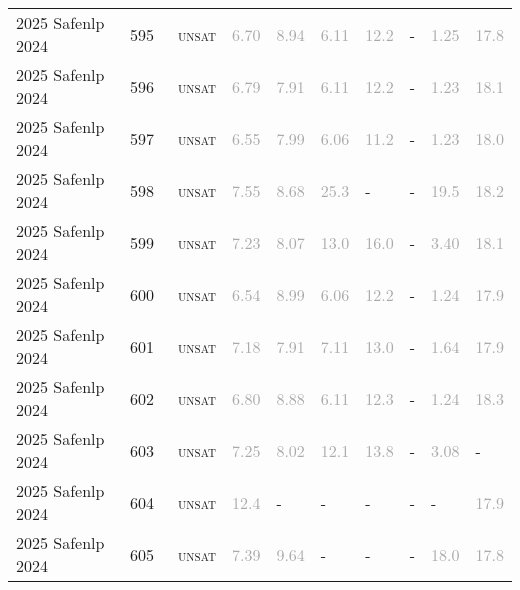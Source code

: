 \begin{center}
{\begin{longtable}{@{}llllllllll@{}}
2025 Safenlp 2024 & 595 & ~\textsc{unsat} & \textcolor{darkgray}{6.70} & \textcolor{darkgray}{8.94} & \textcolor{darkgray}{6.11} & \textcolor{darkgray}{12.2} & - & \textcolor{darkgray}{1.25} & \textcolor{darkgray}{17.8} \\
2025 Safenlp 2024 & 596 & ~\textsc{unsat} & \textcolor{darkgray}{6.79} & \textcolor{darkgray}{7.91} & \textcolor{darkgray}{6.11} & \textcolor{darkgray}{12.2} & - & \textcolor{darkgray}{1.23} & \textcolor{darkgray}{18.1} \\
2025 Safenlp 2024 & 597 & ~\textsc{unsat} & \textcolor{darkgray}{6.55} & \textcolor{darkgray}{7.99} & \textcolor{darkgray}{6.06} & \textcolor{darkgray}{11.2} & - & \textcolor{darkgray}{1.23} & \textcolor{darkgray}{18.0} \\
2025 Safenlp 2024 & 598 & ~\textsc{unsat} & \textcolor{darkgray}{7.55} & \textcolor{darkgray}{8.68} & \textcolor{darkgray}{25.3} & - & - & \textcolor{darkgray}{19.5} & \textcolor{darkgray}{18.2} \\
2025 Safenlp 2024 & 599 & ~\textsc{unsat} & \textcolor{darkgray}{7.23} & \textcolor{darkgray}{8.07} & \textcolor{darkgray}{13.0} & \textcolor{darkgray}{16.0} & - & \textcolor{darkgray}{3.40} & \textcolor{darkgray}{18.1} \\
2025 Safenlp 2024 & 600 & ~\textsc{unsat} & \textcolor{darkgray}{6.54} & \textcolor{darkgray}{8.99} & \textcolor{darkgray}{6.06} & \textcolor{darkgray}{12.2} & - & \textcolor{darkgray}{1.24} & \textcolor{darkgray}{17.9} \\
2025 Safenlp 2024 & 601 & ~\textsc{unsat} & \textcolor{darkgray}{7.18} & \textcolor{darkgray}{7.91} & \textcolor{darkgray}{7.11} & \textcolor{darkgray}{13.0} & - & \textcolor{darkgray}{1.64} & \textcolor{darkgray}{17.9} \\
2025 Safenlp 2024 & 602 & ~\textsc{unsat} & \textcolor{darkgray}{6.80} & \textcolor{darkgray}{8.88} & \textcolor{darkgray}{6.11} & \textcolor{darkgray}{12.3} & - & \textcolor{darkgray}{1.24} & \textcolor{darkgray}{18.3} \\
2025 Safenlp 2024 & 603 & ~\textsc{unsat} & \textcolor{darkgray}{7.25} & \textcolor{darkgray}{8.02} & \textcolor{darkgray}{12.1} & \textcolor{darkgray}{13.8} & - & \textcolor{darkgray}{3.08} & - \\
2025 Safenlp 2024 & 604 & ~\textsc{unsat} & \textcolor{darkgray}{12.4} & - & - & - & - & - & \textcolor{darkgray}{17.9} \\
2025 Safenlp 2024 & 605 & ~\textsc{unsat} & \textcolor{darkgray}{7.39} & \textcolor{darkgray}{9.64} & - & - & - & \textcolor{darkgray}{18.0} & \textcolor{darkgray}{17.8} \\

\end{longtable}}
\end{center}
